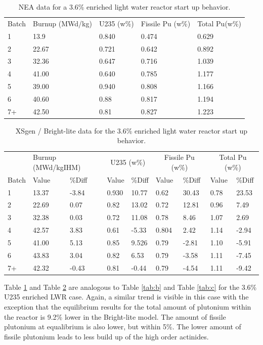 \documentclass{article}
\begin{document}
\begin{table}[!htb]
\centering
\caption{NEA data for a 3.6\% enriched light water reactor start up behavior.}
\label{tab:d}
\begin{tabular}{lllll}
Batch & Burnup (MWd/kg) & U235 (w\%) & Fissile Pu (w\%) & Total Pu(w\%) \\
1 & 13.9 & 0.840 & 0.474 & 0.629 \\
2 & 22.67 & 0.721 & 0.642 & 0.892 \\
3 & 32.36 & 0.647 & 0.716 & 1.039 \\
4 & 41.00 & 0.640 & 0.785 & 1.177 \\
5 & 39.00 & 0.940 & 0.808 & 1.166 \\
6 & 40.60 & 0.88 & 0.817 & 1.194 \\
7+ & 42.50 & 0.81 & 0.827 & 1.223
\end{tabular}
\end{table}

\begin{table}[!htb]
\centering
\caption{XSgen / Bright-lite data for the 3.6\% enriched light water reactor start up behavior.}
\label{tab:e}
\begin{tabular}{l ll  ll  ll  ll}
 & \multicolumn{2}{p{1cm}}{Burnup (MWd/kgIHM)} & \multicolumn{2}{c}{U235 (w\%)} & \multicolumn{2}{c}{Fissile Pu (w\%)} & \multicolumn{2}{c}{Total Pu (w\%)} \\
Batch & Value & \%Diff & Value & \%Diff & Value & \%Diff & Value & \%Diff \\
1 & 13.37 & -3.84 & 0.930 & 10.77 & 0.62 & 30.43 & 0.78 & 23.53 \\
2 & 22.69 & 0.07 & 0.82 & 13.02 & 0.72 & 12.81 & 0.96 & 7.49 \\
3 & 32.38 & 0.03 & 0.72 & 11.08 & 0.78 & 8.46 & 1.07 & 2.69 \\
4 & 42.57 & 3.83 & 0.61 & -5.33 & 0.804 & 2.42 & 1.14 & -2.94 \\
5 & 41.00 & 5.13 & 0.85 & 9.526 & 0.79 & -2.81 & 1.10 & -5.91 \\
6 & 43.83 & 3.04 & 0.82 & 6.53 & 0.79 & -3.58 & 1.11 & -7.45 \\
7+ & 42.32 & -0.43 & 0.81 & -0.44 & 0.79 & -4.54 & 1.11 & -9.42
\end{tabular}
\end{table}

Table \ref{tab:d} and Table \ref{tab:e} are analogous to Table \ref{tab:b} and Table \ref{tab:c}
for the 3.6\% U235 enriched LWR case. Again, a similar trend is visible in this case with the
exception that the equilibrium results for the total amount of plutonium within the
reactor is 9.2\% lower in the Bright-lite model. The amount of fissile plutonium at equalibrium is also lower,
but within 5\%. The lower amount of fissile plutonium leads
to less build up of the high order actinides.
\end{document}
